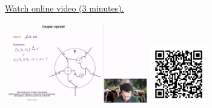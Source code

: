 
\begin{minipage}{10cm}
    \href{https://act4e-spring21.netlify.app/videos/spring2021-operads-b:monoid-act-algebras.html}{Watch online video (3 minutes).}
        
    \href{https://act4e-spring21.netlify.app/videos/spring2021-operads-b:monoid-act-algebras.html}{\includegraphics[height=3.5cm]{spring2021-operads-b:monoid-act-algebras/thumbnails.jpg}}
    \href{https://act4e-spring21.netlify.app/videos/spring2021-operads-b:monoid-act-algebras.html}{\includegraphics[height=2.5cm]{spring2021-operads-b:monoid-act-algebras/qrcode.png}}
\end{minipage}

